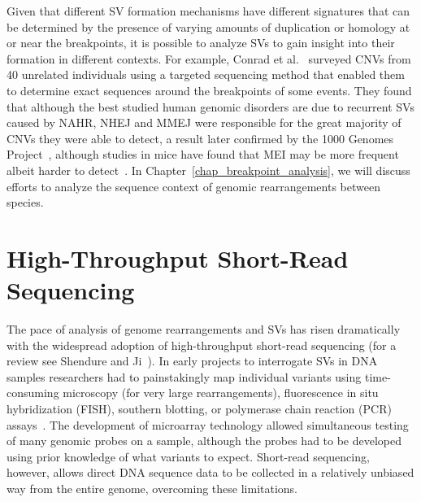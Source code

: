 Given that different SV formation mechanisms have different signatures that can be determined by the presence of varying amounts of duplication or homology at or near the breakpoints, it is possible to analyze SVs to gain insight into their formation in different contexts. For example, Conrad et al.~\cite{Conrad:2010if} surveyed CNVs from 40 unrelated individuals using a targeted sequencing method that enabled them to determine exact sequences around the breakpoints of some events. They found that although the best studied human genomic disorders are due to recurrent SVs caused by NAHR, NHEJ and MMEJ were responsible for the great majority of CNVs they were able to detect, a result later confirmed by the 1000 Genomes Project~\cite{Mills:2011p1611}, although studies in mice have found that MEI may be more frequent albeit harder to detect~\cite{Yalcin:2011tm}.  In Chapter~\ref{chap_breakpoint_analysis}, we will discuss efforts to analyze the sequence context of genomic rearrangements between species.

\section{High-Throughput Short-Read Sequencing}\label{section_sequencing}

The pace of analysis of genome rearrangements and SVs has risen dramatically with the widespread adoption of high-throughput short-read sequencing (for a review see Shendure and Ji~\cite{Shendure:2008jh}). In early projects to interrogate SVs in DNA samples researchers had to painstakingly map individual variants using time-consuming microscopy (for very large rearrangements), fluorescence in situ hybridization (FISH), southern blotting, or polymerase chain reaction (PCR) assays~\cite{Aten:2008dh}. The development of microarray technology allowed simultaneous testing of many genomic probes on a sample, although the probes had to be developed using prior knowledge of what variants to expect. Short-read sequencing, however, allows direct DNA sequence data to be collected in a relatively unbiased way from the entire genome, overcoming these limitations.

